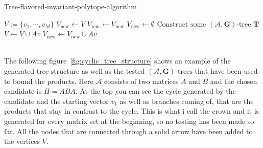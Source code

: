 \vspace{1cm}

\begin{algorithm}
  \caption{Tree-flavored-invariant-polytope-algorithm}
  \label{alg:hybrid}
  \begin{algorithmic}
      \State $V := \{v_1, \cdots, v_M\}$
      \State $V_{\text{new}} \gets V$
          \State $V_{\text{rem}} \gets V_{\text{new}}$
          \State $V_{\text{new}} \gets \emptyset$
              \State $\text{Construct some } (\mathcal{A},\mathbf{G})\text{-tree } \mathbf{T}$
                      \State $V \gets V \cup Av$
                      \State $V_{\text{new}} \gets V_{\text{new}} \cup Av$
                  \EndIf
              \EndFor
          \EndFor
      \EndWhile \\
      \Return \\
  \end{algorithmic}
\end{algorithm}

\vspace{1cm}

The following figure~\ref{fig:cyclic_tree_structure} shows an example of the generated tree structure as well as the tested $(\mathcal{A},\mathbf{G})\text{-trees}$ that have been used to bound the products. Here $\mathcal{A}$ consists of two matrices $A$ and $B$ and the chosen candidate is $ \Pi = ABA$. At the top you can see the cycle generated by the candidate and the starting vector $v_1$ as well as branches coming of, that are the products that stay in contrast to the cycle. This is what i call the crown and it is generated for every matrix set at the beginning, so no testing has been made so far. All the nodes that are connected through a solid arrow have been added to the vertices $V$.

